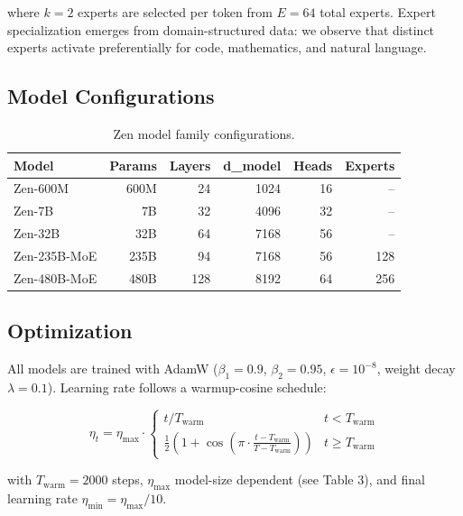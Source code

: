 \documentclass[11pt,a4paper]{article}
\begin{document}
where $k=2$ experts are selected per token from $E=64$ total experts. Expert
specialization emerges from domain-structured data: we observe that distinct experts
activate preferentially for code, mathematics, and natural language.

\subsection{Model Configurations}

\begin{table}[H]
\centering
\begin{tabular}{lrrrrr}
\toprule
\textbf{Model} & \textbf{Params} & \textbf{Layers} & \textbf{d\_model} & \textbf{Heads} & \textbf{Experts} \\
\midrule
Zen-600M & 600M & 24 & 1024 & 16 & -- \\
Zen-7B & 7B & 32 & 4096 & 32 & -- \\
Zen-32B & 32B & 64 & 7168 & 56 & -- \\
Zen-235B-MoE & 235B & 94 & 7168 & 56 & 128 \\
Zen-480B-MoE & 480B & 128 & 8192 & 64 & 256 \\
\bottomrule
\end{tabular}
\caption{Zen model family configurations.}
\end{table}

\subsection{Optimization}

All models are trained with AdamW ($\beta_1=0.9$, $\beta_2=0.95$, $\epsilon=10^{-8}$,
weight decay $\lambda=0.1$). Learning rate follows a warmup-cosine schedule:

\begin{equation}
\eta_t = \eta_{\max} \cdot \begin{cases} t / T_{\text{warm}} & t < T_{\text{warm}} \\ \frac{1}{2}\left(1 + \cos\left(\pi \cdot \frac{t - T_{\text{warm}}}{T - T_{\text{warm}}}\right)\right) & t \geq T_{\text{warm}} \end{cases}
\end{equation}

with $T_{\text{warm}} = 2000$ steps, $\eta_{\max}$ model-size dependent (see Table 3),
and final learning rate $\eta_{\min} = \eta_{\max}/10$.
\end{document}
